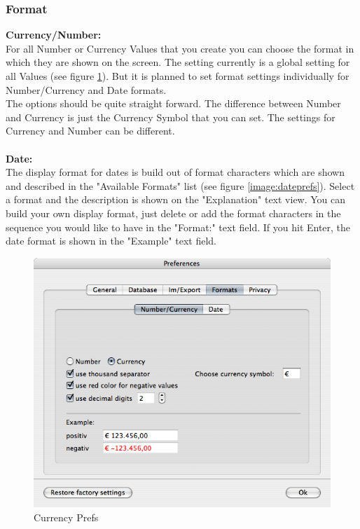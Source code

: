 \documentclass[12pt,a4]{article}
\begin{document}
\subsubsection{Format}
\label{prefs_format}
\medskip
\textbf{Currency/Number:} \\
For all Number or Currency Values that you create you can choose the format in which they are shown on the screen. The setting currently is a global setting for all Values (see figure \ref{image:currencyprefs}). But it is planned to set format settings individually for Number/Currency and Date formats. \\
The options should be quite straight forward. The difference between Number and Currency is just the Currency Symbol that you can set. The settings for Currency and Number can be different. \\
\\
\textbf{Date:} \\
The display format for dates is build out of format characters which are shown and described in the "Available Formats" list (see figure \ref{image:dateprefs}). Select a format and the description is shown on the "Explanation" text view. You can build your own display format, just delete or add the format characters in the sequence you would like to have in the "Format:" text field. If you hit Enter, the date format is shown in the "Example" text field.
% 
\begin{figure}[ht]
\begin{center}
\includegraphics[width=13.5cm]{images/Prefs_CurrencyFormat.png}
\end{center}
\caption{Currency Prefs}
\label{image:currencyprefs}
\end{figure}
\end{document}

